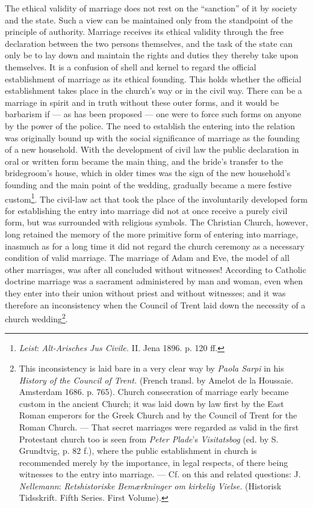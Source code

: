 \documentclass[12pt,a4paper,openany]{book}
\newcommand{\opage}[1]{\marginnote{\footnotesize\textit{[#1]}}}
\begin{document}
The ethical validity of marriage does not rest on the ``sanction'' of it by society and the state. Such a view can be
maintained only from the standpoint of the principle of authority. Marriage receives its ethical validity through the
free declaration between the two persons themselves, and the task of the state can only be to lay down and maintain the
rights and duties they thereby take upon themselves. It is a confusion of shell and kernel to regard the official
establishment of marriage as its ethical founding. This holds whether the official establishment takes place in the
church's way or in the civil way. There can be a marriage in spirit and in truth without these outer forms, and it would
be barbarism if --- as has been proposed --- one were to force such forms on anyone by the power of the police. The need
to establish the entering into the relation was originally bound up with the social significance of marriage as the
founding of a new household. With the development of civil law the public declaration in oral or written form became the
main thing, and the bride's transfer to the bridegroom's house, which in older times was the sign of the new household's
founding and the main point of the wedding, gradually became a mere festive custom\footnote[1]{\emph{Leist}:
\textit{Alt-Arisches Jus Civile.} II. Jena 1896. p. 120 ff.}. The civil-law act that took the place of the
involuntarily developed form for establishing the entry into marriage did not at once receive a purely civil form, but
was surrounded with religious symbols. The Christian Church, however, long retained the memory of the more primitive
form of entering into marriage, inasmuch as for a long time it did not
\opage{305}regard the church ceremony as a necessary condition of valid marriage. The marriage of Adam and Eve, the model
of all other marriages, was after all concluded without witnesses! According to Catholic doctrine marriage was a
sacrament administered by man and woman, even when they enter into their union without priest and without witnesses;
and it was therefore an inconsistency when the Council of Trent laid down the necessity of a church
wedding\footnote[1]{This inconsistency is laid bare in a very clear way by \emph{Paola Sarpi} %
in his \textit{History of
the Council of Trent.} (French transl. by Amelot de la Houssaie. Amsterdam 1686. p. 765). Church consecration of
marriage early became custom in the ancient Church; it was laid down by law first by the East Roman emperors for the
Greek Church and by the Council of Trent for the Roman Church. --- That secret marriages were regarded as valid in the
first Protestant church too is seen from \emph{Peter Plade}'s \textit{Visitatsbog} %
 (ed. by S. Grundtvig, p. 82 f.),
where the public establishment in church is recommended merely by the importance, in legal respects, of there being
witnesses to the entry into marriage. --- Cf. on this and related questions: J. \emph{Nellemann}:
\textit{Retshistoriske Bemærkninger om kirkelig Vielse.} (Historisk Tidsskrift. Fifth Series. First Volume).}.
\end{document}
